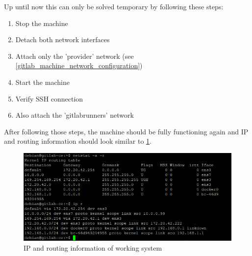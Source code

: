 Up until now this can only be solved temporary by following these steps:
\begin{enumerate}
	\item Stop the machine
	\item Detach both network interfaces
	\item Attach only the 'provider' network (see \ref{gitlab_machine_network_configuration})
	\item Start the machine
	\item Verify SSH connection
	\item Also attach the 'gitlabrunners' network
\end{enumerate}

After following those steps, the machine should be fully functioning again and IP and routing information should look similar to \ref{fig:ip_gateway_ok}.

\begin{figure}[H]
	\centering
	\includegraphics[width=14cm]{images/ip_gateway_ok.png}
	\caption{IP and routing information of working system}
	\label{fig:ip_gateway_ok}
\end{figure}